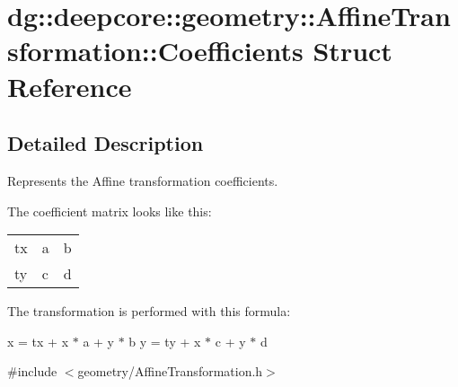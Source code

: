 \hypertarget{structdg_1_1deepcore_1_1geometry_1_1_affine_transformation_1_1_coefficients}{}\section{dg\+:\+:deepcore\+:\+:geometry\+:\+:Affine\+Transformation\+:\+:Coefficients Struct Reference}
\label{structdg_1_1deepcore_1_1geometry_1_1_affine_transformation_1_1_coefficients}


\subsection{Detailed Description}
Represents the Affine transformation coefficients. 

The coefficient matrix looks like this\+:

\tabulinesep=1mm
\begin{longtabu} spread 0pt [c]{*3{|X[-1]}|}
\hline
tx  &a  &b   \\
ty  &c  &d   \\
\end{longtabu}


The transformation is performed with this formula\+:

x\textquotesingle{} = tx + x $\ast$ a + y $\ast$ b y\textquotesingle{} = ty + x $\ast$ c + y $\ast$ d 

{\ttfamily \#include $<$geometry/\+Affine\+Transformation.\+h$>$}

